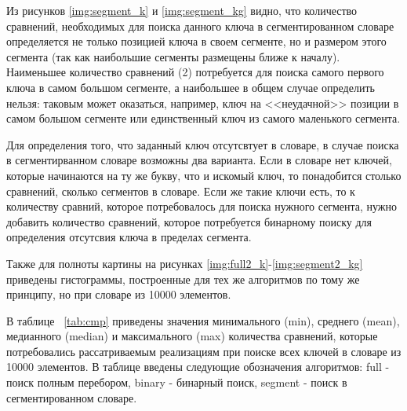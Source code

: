 Из рисунков \ref{img:segment_k} и \ref{img:segment_kg} видно, что количество сравнений, необходимых для поиска данного ключа в сегментированном словаре определяется не только позицией ключа в своем сегменте, но и размером этого сегмента (так как наибольшие сегменты размещены ближе к началу). Наименьшее количество сравнений (2) потребуется для поиска самого первого ключа в самом большом сегменте, а наибольшее в общем случае определить нельзя: таковым может оказаться, например, ключ на <<неудачной>> позиции в самом большом сегменте или единственный ключ из самого маленького сегмента. 

Для определения того, что заданный ключ отсутсвтует в словаре, в случае поиска в сегментирванном словаре возможны два варианта. Если в словаре нет ключей, которые начинаются на ту же букву, что и искомый ключ, то понадобится столько сравнений, сколько сегментов в словаре. Если же такие ключи есть, то к количеству сравний, которое потребовалось для поиска нужного сегмента, нужно добавить количество сравнений, которое потребуется бинарному поиску для определения отсутсвия ключа в пределах сегмента.

Также для полноты картины на рисунках \ref{img:full2_k}-\ref{img:segment2_kg} приведены гистограммы, построенные для тех же алгоритмов по тому же принципу, но при словаре из 10000 элементов. 

\clearpage
{}

\clearpage
{}

\clearpage
{}

\clearpage
В таблице ~\ref{tab:cmp} приведены значения минимального (min), среднего (mean), медианного (median) и максимального (max) количества сравнений, которые потребовались рассатриваемым реализациям при поиске всех ключей в словаре из 10000 элементов. В таблице введены следующие обозначения алгоритмов: full - поиск полным перебором, binary - бинарный поиск, segment - поиск в сегментированном словаре.

